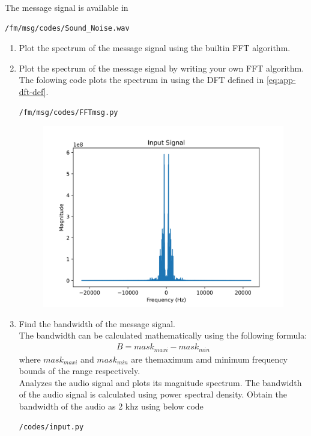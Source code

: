 The message signal is available in 
\begin{lstlisting}
/fm/msg/codes/Sound_Noise.wav
\end{lstlisting}
\begin{enumerate}[label=\arabic*.,ref=\thesection.\theenumi]
\item Plot the spectrum of the message signal using the builtin FFT algorithm.\\
	\solution
\item Plot the spectrum of the message signal by writing your own FFT algorithm.
	\\
	\solution 
		The folowing code plots the spectrum in \figref{} using the DFT defined in  
	\eqref{eq:app-dft-def}.
\begin{lstlisting}
/fm/msg/codes/FFTmsg.py
\end{lstlisting}
\begin{figure}[h]
    \includegraphics[scale=0.55]{fm/msg/inputs-1.png}
\end{figure}
\item Find the bandwidth of the message signal.\\
\solution The bandwidth can be calculated mathematically using the following formula:
\begin{align*}
B=mask_{maxi}-mask_{min}
\end{align*}
where $mask_{maxi}$ and $mask_{min} $ are themaximum amd minimum frequency bounds of the range  respectively.\\
Analyzes the audio signal and plots its magnitude spectrum. The bandwidth of the audio signal is  calculated using power spectral density. Obtain the bandwidth of the audio as 2 khz using below code
\begin{lstlisting}
/codes/input.py
\end{lstlisting}
\end{enumerate}
